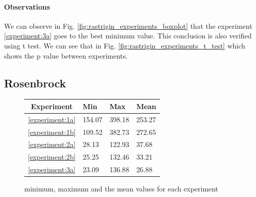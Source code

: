 \documentclass{article}
\begin{document}
\paragraph{Observations} We can observe in Fig. \ref{fig:rastrigin_experiments_boxplot} that the experiment \ref{experiment:3a} goes to the best minimum value. This conclusion is also verified using t test. We can see that in Fig. \ref{fig:rastrigin_experiments_t_test} which shows the p value between experiments.

\subsection{Rosenbrock}

\begin{figure}[!htbp]
	\begin{tabular}{||c|||l|l|l||}
		\hline
		Experiment & Min & Max & Mean \\ \hline \hline
		\ref{experiment:1a} & 154.07 & 398.18 & 253.27 \\ \hline
		\ref{experiment:1b} & 109.52 & 382.73 & 272.65 \\ \hline
		\ref{experiment:2a} & 28.13 & 122.93 & 37.68   \\ \hline
		\ref{experiment:2b} & 25.25 & 132.46 & 33.21   \\ \hline
		\ref{experiment:3a} & 23.09 & 136.88 & 26.88  \\ \hline
	\end{tabular}
	\caption{minimum, maximum and the mean values for each experiment}
\end{figure}
\FloatBarrier
\end{document}
